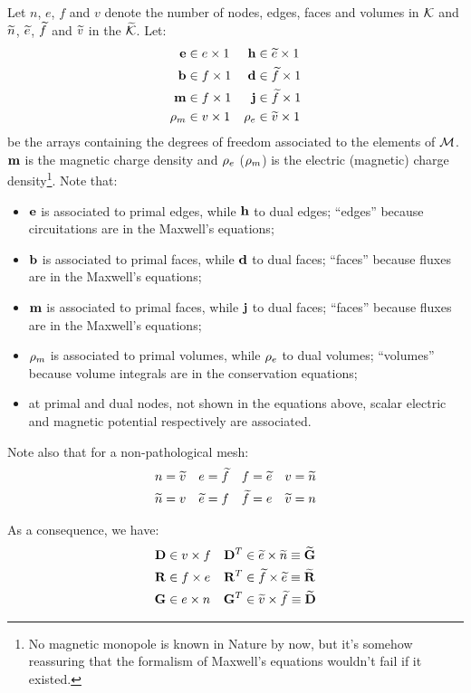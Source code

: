 Let $n$, $e$, $f$ and $v$ denote the number of nodes, edges, faces and
volumes in $\mathcal{K}$ and $\widetilde{n}$, $\widetilde{e}$, $\widetilde{f}$ and
$\widetilde{v}$ in the $\widetilde{\mathcal{K}}$. Let:
\begin{align*}
  \mathbf{e} & \in {e \times 1} & \mathbf{h} & \in {\widetilde{e} \times 1} \\
  \mathbf{b} & \in {f \times 1} & \mathbf{d} & \in {\widetilde{f} \times 1} \\
  \mathbf{m} & \in {f \times 1} & \mathbf{j} & \in {\widetilde{f} \times 1} \\
  \mathbf{\rho}_m & \in {v \times 1} & \mathbf{\rho}_e & \in {\widetilde{v} \times 1}
\end{align*}
be the arrays containing the degrees of freedom associated to the
elements of $\mathcal{M}$. $\mathbf{m}$ is the magnetic charge density and
$\mathbf{\rho}_e$ ($\mathbf{\rho}_m$) is the electric (magnetic) charge
density\footnote{No magnetic monopole is known in Nature by now, but
it's somehow reassuring that the formalism of Maxwell's equations
wouldn't fail if it existed.}. Note that:
\begin{itemize}
\item
  $\mathbf{e}$ is associated to primal edges, while $\mathbf{h}$ to dual
  edges; ``edges'' because circuitations are in the Maxwell's equations;
\item
  $\mathbf{b}$ is associated to primal faces, while $\mathbf{d}$ to dual
  faces; ``faces'' because fluxes are in the Maxwell's equations;
\item
  $\mathbf{m}$ is associated to primal faces, while $\mathbf{j}$ to dual
  faces; ``faces'' because fluxes are in the Maxwell's equations;
\item
  $\mathbf{\rho}_m$ is associated to primal volumes, while
  $\mathbf{\rho}_e$ to dual volumes; ``volumes'' because volume
  integrals are in the conservation equations;
\item
  at primal and dual nodes, not shown in the equations above, scalar
  electric and magnetic potential respectively are associated.
\end{itemize}

Note also that for a non-pathological mesh:
\begin{align*}
  n = \widetilde{v} && e = \widetilde{f} && f = \widetilde{e} && v = \widetilde{n} \\
  \widetilde{n} = v && \widetilde{e} = f && \widetilde{f} = e && \widetilde{v} = n
\end{align*}

As a consequence, we have:
\begin{align*}
  \mathbf{D} & \in {v \times f} & {\mathbf{D}}^T & \in {\widetilde{e} \times \widetilde{n}} \equiv \widetilde{\mathbf{G}} \\
  \mathbf{R} & \in {f \times e} & {\mathbf{R}}^T & \in {\widetilde{f} \times \widetilde{e}} \equiv \widetilde{\mathbf{R}} \\
  \mathbf{G} & \in {e \times n} & {\mathbf{G}}^T & \in {\widetilde{v} \times \widetilde{f}} \equiv \widetilde{\mathbf{D}}
\end{align*}

